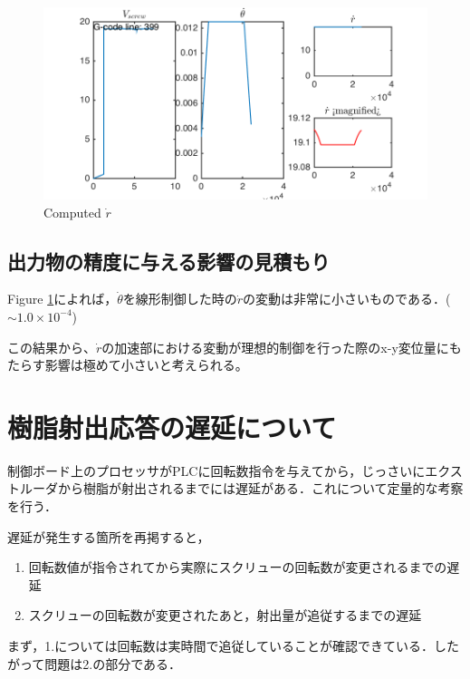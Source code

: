 \documentclass[twocolumn,oneside,a4paper]{article}
\begin{document}
\begin{figure}[h]
    \includegraphics[bb=0 0 432 216,width=1\columnwidth]{compute_rdot_screenshot.png}
    \caption{Computed $\dot r$}
   \label{eq:rdot_simulation}
\end{figure}

\subsection{出力物の精度に与える影響の見積もり}
Figure \ref{eq:rdot_simulation}によれば，$\dot{\theta}$を線形制御した時の$\dot r$の変動は非常に小さいものである．($\sim 1.0 \times 10^{-4}$)

この結果から、$\dot r$の加速部における変動が理想的制御を行った際のx-y変位量にもたらす影響は極めて小さいと考えられる。



\section{樹脂射出応答の遅延について}
制御ボード上のプロセッサがPLCに回転数指令を与えてから，じっさいにエクストルーダから樹脂が射出されるまでには遅延がある．これについて定量的な考察を行う．

遅延が発生する箇所を再掲すると，
\begin{enumerate}
    \item 回転数値が指令されてから実際にスクリューの回転数が変更されるまでの遅延
    \item スクリューの回転数が変更されたあと，射出量が追従するまでの遅延
\end{enumerate}

まず，1.については回転数は実時間で追従していることが確認できている．したがって問題は2.の部分である．
\end{document}
